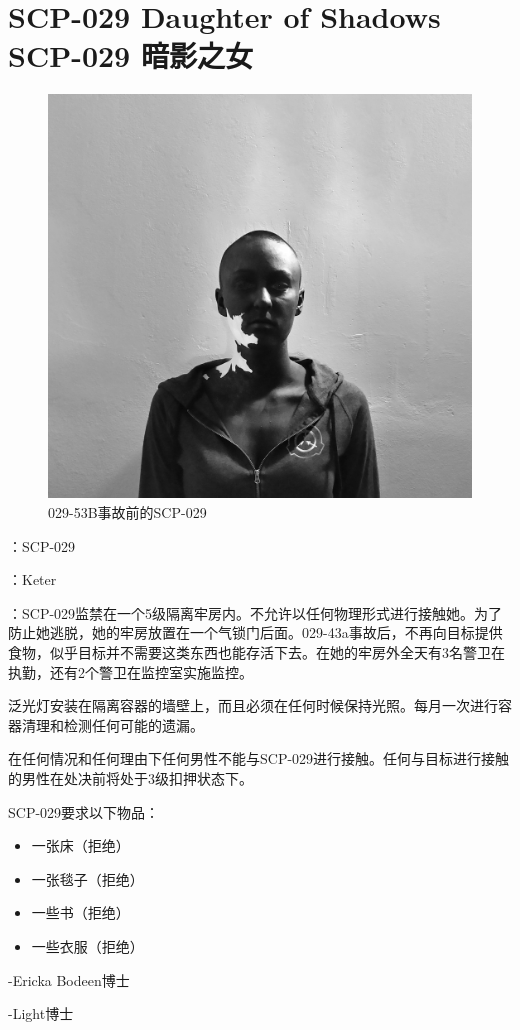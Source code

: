 \chapter[SCP-029 暗影之女]{
    SCP-029 Daughter of Shadows\\
    SCP-029 暗影之女
}

\label{chap:SCP-029}

\begin{figure}[H]
    \centering
    \includegraphics[width=0.5\linewidth]{images/SCP.029.png}
    \caption*{029-53B事故前的SCP-029}
\end{figure}

：SCP-029

：Keter

：SCP-029监禁在一个5级隔离牢房内。不允许以任何物理形式进行接触她。为了防止她逃脱，她的牢房放置在一个气锁门后面。029-43a事故后，不再向目标提供食物，似乎目标并不需要这类东西也能存活下去。在她的牢房外全天有3名警卫在执勤，还有2个警卫在监控室实施监控。

泛光灯安装在隔离容器的墙壁上，而且必须在任何时候保持光照。每月一次进行容器清理和检测任何可能的遗漏。

在任何情况和任何理由下任何男性不能与SCP-029进行接触。任何与目标进行接触的男性在处决前将处于3级扣押状态下。

SCP-029要求以下物品：

\begin{itemize}
\item 一张床（拒绝）
\item 一张毯子（拒绝）
\item 一些书（拒绝）
\item 一些衣服（拒绝）
\end{itemize}

-Ericka Bodeen博士

-Light博士

